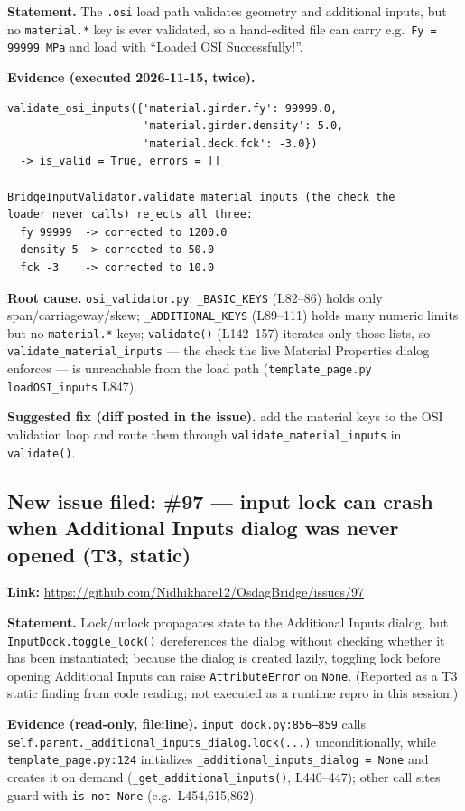 \documentclass[11pt,a4paper]{article}
\begin{document}
\textbf{Statement.} The \texttt{.osi} load path validates geometry and additional inputs, but no \texttt{material.*} key is ever validated, so a hand-edited file can carry e.g.\ \texttt{Fy\,=\,99999\,MPa} and load with ``Loaded OSI Successfully!''.

\textbf{Evidence (executed 2026-11-15, twice).}
\begin{verbatim}
validate_osi_inputs({'material.girder.fy': 99999.0,
                     'material.girder.density': 5.0,
                     'material.deck.fck': -3.0})
  -> is_valid = True, errors = []

BridgeInputValidator.validate_material_inputs (the check the
loader never calls) rejects all three:
  fy 99999  -> corrected to 1200.0
  density 5 -> corrected to 50.0
  fck -3    -> corrected to 10.0
\end{verbatim}

\textbf{Root cause.} \texttt{osi\_validator.py}: \texttt{\_BASIC\_KEYS} (L82--86) holds only span/carriageway/skew; \texttt{\_ADDITIONAL\_KEYS} (L89--111) holds many numeric limits but no \texttt{material.*} keys; \texttt{validate()} (L142--157) iterates only those lists, so \texttt{validate\_material\_inputs} --- the check the live Material Properties dialog enforces --- is unreachable from the load path (\texttt{template\_page.py} \texttt{loadOSI\_inputs} L847).

\textbf{Suggested fix (diff posted in the issue).} add the material keys to the OSI validation loop and route them through \texttt{validate\_material\_inputs} in \texttt{validate()}.

\subsection{New issue filed: \#97 --- input lock can crash when Additional Inputs dialog was never opened (T3, static)}
\textbf{Link:} \url{https://github.com/Nidhikhare12/OsdagBridge/issues/97}

\textbf{Statement.} Lock/unlock propagates state to the Additional Inputs dialog, but \texttt{InputDock.toggle\_lock()} dereferences the dialog without checking whether it has been instantiated; because the dialog is created lazily, toggling lock before opening Additional Inputs can raise \texttt{AttributeError} on \texttt{None}. (Reported as a T3 static finding from code reading; not executed as a runtime repro in this session.)

\textbf{Evidence (read-only, file:line).} \texttt{input\_dock.py:856--859} calls \texttt{self.parent.\_additional\_inputs\_dialog.lock(...)} unconditionally, while \texttt{template\_page.py:124} initializes \texttt{\_additional\_inputs\_dialog = None} and creates it on demand (\texttt{\_get\_additional\_inputs()}, L440--447); other call sites guard with \texttt{is not None} (e.g.\ L454,615,862).
\end{document}
